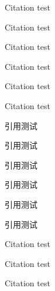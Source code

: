 \documentclass[UTF8,scheme=plain,fontset=fandol]{ctexart}
\begin{document}
\START
\showoutput

Citation \citet{jon88} test\par
Citation \citet[42]{jon89} test\par
Citation\citep{jon88} test\par
Citation\citep[42]{jon90} test\par
Citation \citep[see][]{jon90} test\par
Citation \citep[see][42]{jon90} test\par

引用\citet{lzp1}测试\par
引用\citet[42]{lzp2}测试\par
引用\citep{lzp1}测试\par
引用\citep[42]{lzp1}测试\par
引用\citep[见][]{lzp1}测试\par
引用\citep[见][42]{lzp1}测试\par

Citation\citep{jon88} test\par
Citation\citep{jon89,jon90} test\par
Citation\citep{lzp1,lzp2,lzp3} test\par

\clearpage
\OMIT


\end{document}
